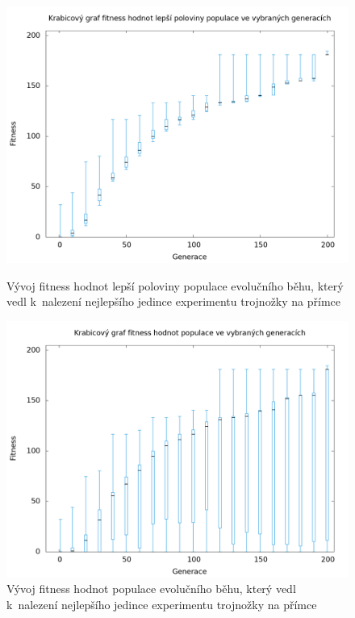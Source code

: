 \begin{figure}[h]
    \begin{minipage}[c]{0.48\linewidth}
        \includegraphics[width=\linewidth]{obrazky/bar_whisker_trojnozka_primka_top50.png}
        \caption{Vývoj fitness hodnot lepší poloviny populace evolučního běhu, který vedl k~nalezení nejlepšího jedince experimentu trojnožky na přímce}
        \label{fig:bar_whisker_trojnozka_primka_top50}
    \end{minipage}
    \hfill
    \begin{minipage}[c]{0.48\linewidth}
        \includegraphics[width=\linewidth]{obrazky/bar_whisker_trojnozka_primka.png}
        \caption{Vývoj fitness hodnot populace evolučního běhu, který vedl k~nalezení nejlepšího jedince experimentu trojnožky na přímce}
        \label{fig:bar_whisker_trojnozka_primka}
    \end{minipage}
\end{figure}

